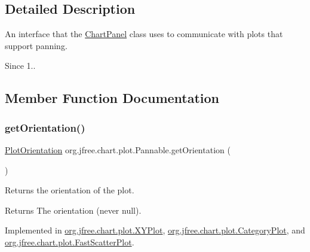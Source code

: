 \subsection{Detailed Description}
An interface that the \mbox{\hyperlink{classorg_1_1jfree_1_1chart_1_1_chart_panel}{Chart\+Panel}} class uses to communicate with plots that support panning.

\begin{DoxySince}{Since}
1.. 
\end{DoxySince}


\subsection{Member Function Documentation}
\mbox{\label{interfaceorg_1_1jfree_1_1chart_1_1plot_1_1_pannable_a09abf56f19f9173a9c1898ba03efdf8b}} 
\subsubsection{\texorpdfstring{get\+Orientation()}{getOrientation()}}
{\footnotesize\ttfamily \mbox{\hyperlink{classorg_1_1jfree_1_1chart_1_1plot_1_1_plot_orientation}{Plot\+Orientation}} org.\+jfree.\+chart.\+plot.\+Pannable.\+get\+Orientation (\begin{DoxyParamCaption}{ }\end{DoxyParamCaption})}

Returns the orientation of the plot.

\begin{DoxyReturn}{Returns}
The orientation (never {\ttfamily null}). 
\end{DoxyReturn}


Implemented in \mbox{\hyperlink{classorg_1_1jfree_1_1chart_1_1plot_1_1_x_y_plot_a5b0c5d43d190ffdfc7cdee341c0e6990}{org.\+jfree.\+chart.\+plot.\+X\+Y\+Plot}}, \mbox{\hyperlink{classorg_1_1jfree_1_1chart_1_1plot_1_1_category_plot_ab765cf8f5fe1dcf554b1a223bbe2d158}{org.\+jfree.\+chart.\+plot.\+Category\+Plot}}, and \mbox{\hyperlink{classorg_1_1jfree_1_1chart_1_1plot_1_1_fast_scatter_plot_af6a4373b3880bdd8c8e20d009c21c0fc}{org.\+jfree.\+chart.\+plot.\+Fast\+Scatter\+Plot}}.

